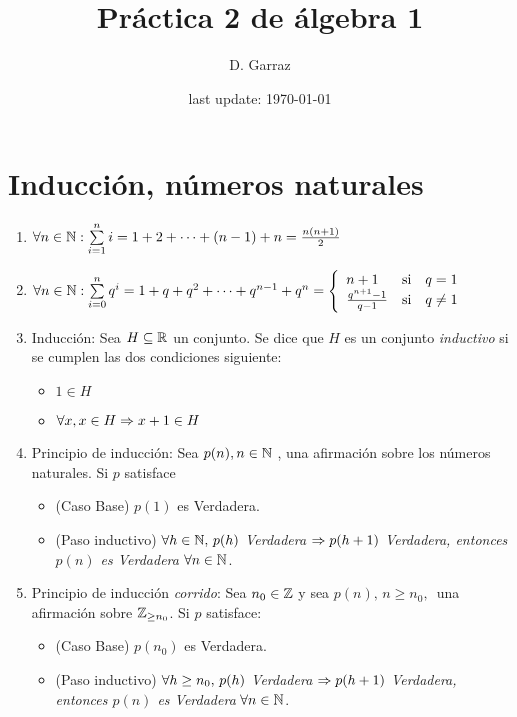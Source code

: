 \documentclass[12pt,a4paper, spanish]{article}
\begin{document}
\pagestyle{empty} %

\title{Práctica 2 de álgebra 1} %
\author{D. Garraz} %
\date{last update: \today} %

\section*{Inducción, números naturales}

\begin{enumerate}
	\item $\paratodo n \en \naturales: \sumatoria{i = 1}{n} i =  1 + 2 + \cdots + (n-1) + n = \frac{n(n+1)}{2}$

	\item $\paratodo n \en \naturales: \sumatoria{i = 0}{n} q^i =
		      1 + q + q^2 + \cdots  + q^{n-1} + q^n =
		      \llave{lll}{
			      n+1 & \text{si} & q = 1\\
			      \frac{q^{n+1}-1}{q-1} & \text{si} & q \distinto 1\\
		      }$

	\item Inducción: Sea $H \subseteq \reales$ un conjunto. Se dice que $H$ es un conjunto \textit{inductivo} si se cumplen las dos condiciones siguiente:
	      \begin{itemize}
		      \item $1 \in H$
		      \item $\paratodo x , x \in H \entonces x+1 \en H$
	      \end{itemize}

	\item Principio de inducción: Sea $p(n), n \in \naturales$ , una afirmación sobre los números naturales.
	      Si $p$ satisface
	      \begin{itemize}
		      \item (Caso Base) $p(1)$ es Verdadera.
		      \item (Paso inductivo) $\paratodo h \en \naturales,\, p(h)$ \textit{Verdadera}
		            $\entonces p(h+1)$ \textit{Verdadera, entonces $p(n)$ es Verdadera} $\paratodo n \en \naturales$.
	      \end{itemize}

	\item Principio de inducción \textit{corrido}: Sea $n_0 \en \enteros$ y sea $p(n),\, n\geq n_0,\,$ una afirmación sobre $\enteros_{\geq n_0}$. Si $p$
	      satisface:
	      \begin{itemize}
		      \item (Caso Base) $p(n_0)$ es Verdadera.
		      \item (Paso inductivo) $\paratodo h \geq n_0,\, p(h)$ \textit{Verdadera}
		            $\entonces p(h+1)$ \textit{Verdadera, entonces $p(n)$ es Verdadera} $\paratodo n \en \naturales$.
	      \end{itemize}
\end{enumerate}
\end{document}
